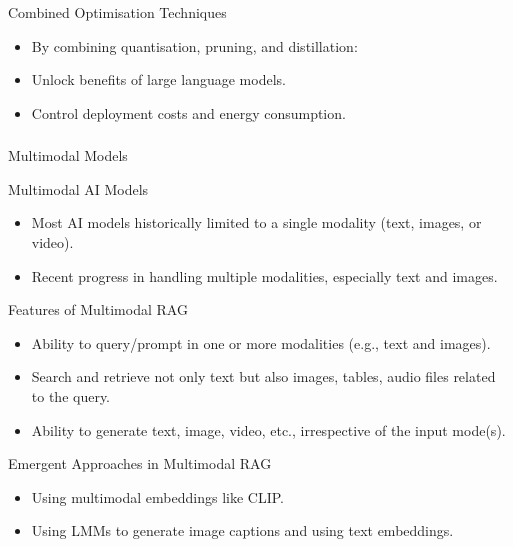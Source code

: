 \begin{frame}[fragile]{Combined Optimisation Techniques}
  \begin{itemize}
    \item By combining quantisation, pruning, and distillation:
    \item Unlock benefits of large language models.
    \item Control deployment costs and energy consumption.
  \end{itemize}
\end{frame}


\begin{frame}[fragile]\frametitle{}
\begin{center}
{\Large Multimodal Models}
\end{center}
\end{frame}


\begin{frame}[fragile]{Multimodal AI Models}
    \begin{itemize}
        \item Most AI models historically limited to a single modality (text, images, or video).
        \item Recent progress in handling multiple modalities, especially text and images.
    \end{itemize}
\end{frame}

\begin{frame}[fragile]{Features of Multimodal RAG}
    \begin{itemize}
        \item Ability to query/prompt in one or more modalities (e.g., text and images).
        \item Search and retrieve not only text but also images, tables, audio files related to the query.
        \item Ability to generate text, image, video, etc., irrespective of the input mode(s).
    \end{itemize}
\end{frame}

\begin{frame}[fragile]{Emergent Approaches in Multimodal RAG}
    \begin{itemize}
        \item Using multimodal embeddings like CLIP.
        \item Using LMMs to generate image captions and using text embeddings.
    \end{itemize}
\end{frame}

